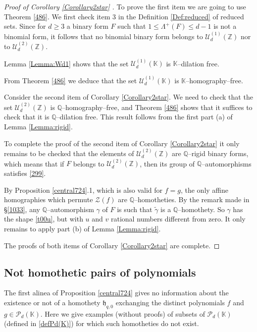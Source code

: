 \documentclass[10pt]{article}
\theoremstyle{definition}
\numberwithin{equation}{section}
\newcommand {\Q}{{\mathbb{Q}}}
\newcommand {\Z}{{\mathbb{Z}}}
\newcommand {\K}{{\mathbb{K}}}
\begin{document}
 \begin{proof}[Proof of Corollary \ref{Corollary2star} ]
To prove the first item we are going to use Theorem \ref{486}. 
We first check item 3 in the Definition \ref{Def:reduced} of reduced sets. 
Since for $d\geqslant 3$ a binary form $F$ such that $1\leqslant \Lambda^+(F)\leqslant d-1$ is not a binomial form, it follows that no binomial binary form belongs to $\mathcal U_d^{(1)} (\Z)$ nor to $\mathcal U_d^{(2)} (\Z)$. 

Lemma \ref{Lemma:Wd1} shows that the set $\mathcal U_d^{(1)} (\K)$ is $\K$--dilation free. 

From Theorem \ref{486} we deduce that the set $\mathcal U_d^{(1)} (\K)$ is $\K$--homography--free.

Consider the second item of Corollary \ref{Corollary2star}. We need to check that the set $\mathcal U_d^{(2)} (\Z)$ is $\Q$--homography--free, and Theorem \ref{486} shows that it suffices to check that it is $\Q$--dilation free. This result follows from the first part (a) of Lemma \ref{Lemma:rigid}.

To complete the proof of the second item of Corollary \ref{Corollary2star} 
it only remains to be checked that the elements of $\mathcal U^{(2)}_d (\Z)$ are $\Q$--rigid binary forms, which means that if $F $ belongs to $\mathcal U^{(2)}_d (\Z)$, then its group of $\Q$--automorphisms satisfies \eqref{299}. 

By Proposition \ref{central724}.1, 
which is also valid for $f=g$, the only affine homographies which permute $\mathcal Z (f)$ are $\Q$--homotheties. 
By the remark made in \S \ref{1033}, 
any $\Q$--automorphism $\gamma$ of $F$ is such that 
$\tilde \gamma$ is a $\Q$--homothety. So $\gamma$ has the shape \eqref{t00u}, but with $u$ and $v$ rational numbers different from zero. 
It only remains to apply part (b) of Lemma \ref{Lemma:rigid}. 

 The proofs of both items of Corollary \ref{Corollary2star} are complete.
 \end{proof}
 
 
\subsection{Not homothetic pairs of polynomials}%

The first alinea of Proposition \ref{central724} gives no information about the existence or not of a homothety $\mathfrak h_{q,0}$ exchanging the distinct polynomials $f$ and $g\in \mathcal P_d (\K)$.
Here we give examples (without proofs) of subsets of $\mathcal P_d (\K)$ (defined in \eqref{defPd(K)}) for which such homotheties do not exist. 
\end{document}

